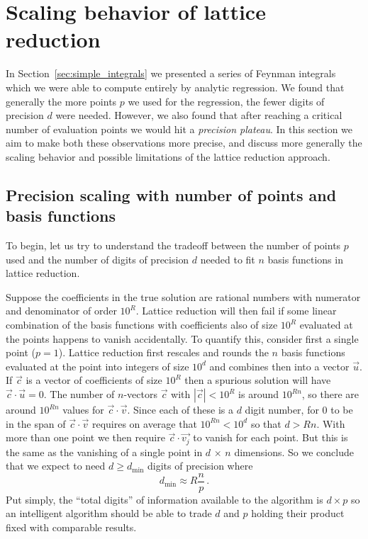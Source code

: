 \documentclass[a4paper,11pt]{article}
\newcommand{\dmin}{d_{\text{min}}}
\begin{document}
\section{Scaling behavior of lattice reduction}\label{sec:lll_limitations}

In Section~\ref{sec:simple_integrals} we presented a series of Feynman integrals which we were able to compute entirely by analytic regression. We found that generally the more points $p$ we used for the regression, the fewer digits of precision $d$ were needed. However, we also found that after reaching a critical number of evaluation points we would hit a \textit{precision plateau}. In this section we aim to make both these observations more precise, and discuss more generally the scaling behavior and possible limitations of  the lattice reduction approach.


\subsection{Precision scaling with number of points and basis functions}\label{sec:p_d_scaling}


To begin, let us try to understand the tradeoff between the number of points $p$ used and the number of digits of precision $d$ needed to fit $n$ basis functions in lattice reduction.

Suppose the coefficients in the true solution are rational numbers with numerator and denominator of order $10^R$. Lattice reduction will then fail if some linear combination of the basis functions with coefficients also of size $10^R$ evaluated at the points happens to vanish accidentally. To quantify this, consider first a single point ($p=1$). Lattice reduction first rescales and rounds the $n$ basis functions evaluated at the point into integers of size $10^d$ and combines then into a vector $\vec{u}$. If $\vec{c}$ is a vector of coefficients of size $10^R$ then a spurious solution will have $\vec{c} \cdot \vec{u}=0$. The number of $n$-vectors $\vec{c}$ with $|\vec{c}| < 10^R$ is around $10^{Rn}$, so there are around $10^{Rn}$ values for $\vec{c} \cdot \vec{v}$. Since each of these is a $d$ digit number, for 0 to be in the span of $\vec{c} \cdot \vec{v}$  requires on average that $10^{Rn} < 10^d$ so that $d> R n$. With more than one point we then require 
$\vec{c} \cdot \vec{v_j}$ to vanish for each point. But this is the same as the vanishing of a single point in $d\, \times\,n$ dimensions. So we conclude that we expect to need $d \ge \dmin$ digits of precision where
\begin{equation}
    \dmin \approx R \frac{n }{p} \,.\label{theory}
\end{equation}
Put simply,
the ``total digits'' of information available to the algorithm is $d\times p$ so an intelligent algorithm should be able to trade $d$ and $p$ holding their product fixed with comparable results.
 
\end{document}
